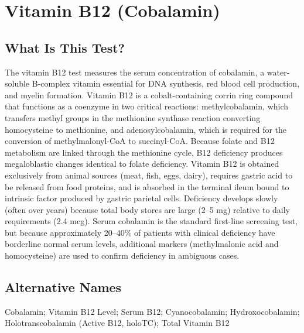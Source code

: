 \chapter{Vitamin B12 (Cobalamin)}

\section*{What Is This Test?}
The vitamin B12 test measures the serum concentration of cobalamin, a water-soluble B-complex vitamin essential for DNA synthesis, red blood cell production, and myelin formation. Vitamin B12 is a cobalt-containing corrin ring compound that functions as a coenzyme in two critical reactions: methylcobalamin, which transfers methyl groups in the methionine synthase reaction converting homocysteine to methionine, and adenosylcobalamin, which is required for the conversion of methylmalonyl-CoA to succinyl-CoA. Because folate and B12 metabolism are linked through the methionine cycle, B12 deficiency produces megaloblastic changes identical to folate deficiency. Vitamin B12 is obtained exclusively from animal sources (meat, fish, eggs, dairy), requires gastric acid to be released from food proteins, and is absorbed in the terminal ileum bound to intrinsic factor produced by gastric parietal cells. Deficiency develops slowly (often over years) because total body stores are large (2--5 mg) relative to daily requirements (2.4 mcg). Serum cobalamin is the standard first-line screening test, but because approximately 20--40\% of patients with clinical deficiency have borderline normal serum levels, additional markers (methylmalonic acid and homocysteine) are used to confirm deficiency in ambiguous cases.

\section*{Alternative Names}
Cobalamin; Vitamin B12 Level; Serum B12; Cyanocobalamin; Hydroxocobalamin; Holotranscobalamin (Active B12, holoTC); Total Vitamin B12

